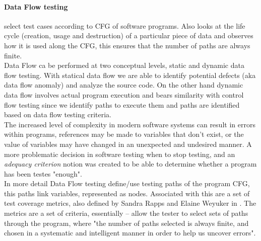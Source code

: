 \documentclass{llncs}
\begin{document}
\paragraph{Data Flow testing} select test cases according to CFG of software programs. Also looks at the life cycle (creation, usage and destruction)
of a particular piece of data and observes how it is used along the CFG, this ensures that the number of paths are always finite\cite{dataflow}.\\
Data Flow ca be performed at two conceptual levels, static and dynamic data flow testing. With statical data flow we are able to identify potential
defects (aka data flow anomaly) and analyze the source code. On the other hand dynamic data flow involves actual program execution and bears similarity with control flow testing
since we identify paths to execute them and paths are identified based on data flow testing criteria.\\
The increased level of complexity in modern software systems can result in errors within programs, references may be made to variables that don't exist,
or the value of variables may have changed in an unexpected and undesired manner. A more problematic decision in software testing when to stop testing,
and an \textit{adequacy criterion}\cite{Frankl:1988:AFD:53064.53075} notion was created to be able to determine whether a program has been testes "enough".\\
In more detail Data Flow testing define/use testing paths of the program CFG, this paths link variables, represented as nodes\cite{dataflow}.
Associated with this are a set of test coverage metrics, also defined by Sandra Rapps and Elaine Weyuker in \cite{dataflow}.
The metrics are a set of criteria, essentially – allow the tester to select sets of paths through the program, where "the number of paths selected
is always finite, and chosen in a systematic and intelligent manner in order to
help us uncover errors".
\end{document}
